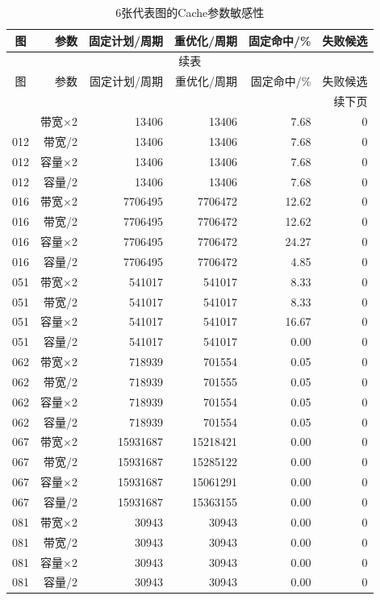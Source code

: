 \begin{longtable}{crrrrr}
\caption{6张代表图的Cache参数敏感性}\label{tab:sensitivity-detail}\\
\toprule
图 & 参数 & 固定计划/周期 & 重优化/周期 & 固定命中/\% & 失败候选 \\
\midrule
\endfirsthead
\multicolumn{6}{c}{续表}\\
\toprule
图 & 参数 & 固定计划/周期 & 重优化/周期 & 固定命中/\% & 失败候选 \\
\midrule
\endhead
\midrule\multicolumn{6}{r}{续下页}\\
\endfoot
\bottomrule
\endlastfoot
012 & 带宽×2 & 13406 & 13406 & 7.68 & 0 \\
012 & 带宽/2 & 13406 & 13406 & 7.68 & 0 \\
012 & 容量×2 & 13406 & 13406 & 7.68 & 0 \\
012 & 容量/2 & 13406 & 13406 & 7.68 & 0 \\
016 & 带宽×2 & 7706495 & 7706472 & 12.62 & 0 \\
016 & 带宽/2 & 7706495 & 7706472 & 12.62 & 0 \\
016 & 容量×2 & 7706495 & 7706472 & 24.27 & 0 \\
016 & 容量/2 & 7706495 & 7706472 & 4.85 & 0 \\
051 & 带宽×2 & 541017 & 541017 & 8.33 & 0 \\
051 & 带宽/2 & 541017 & 541017 & 8.33 & 0 \\
051 & 容量×2 & 541017 & 541017 & 16.67 & 0 \\
051 & 容量/2 & 541017 & 541017 & 0.00 & 0 \\
062 & 带宽×2 & 718939 & 701554 & 0.05 & 0 \\
062 & 带宽/2 & 718939 & 701555 & 0.05 & 0 \\
062 & 容量×2 & 718939 & 701554 & 0.05 & 0 \\
062 & 容量/2 & 718939 & 701554 & 0.05 & 0 \\
067 & 带宽×2 & 15931687 & 15218421 & 0.00 & 0 \\
067 & 带宽/2 & 15931687 & 15285122 & 0.00 & 0 \\
067 & 容量×2 & 15931687 & 15061291 & 0.00 & 0 \\
067 & 容量/2 & 15931687 & 15363155 & 0.00 & 0 \\
081 & 带宽×2 & 30943 & 30943 & 0.00 & 0 \\
081 & 带宽/2 & 30943 & 30943 & 0.00 & 0 \\
081 & 容量×2 & 30943 & 30943 & 0.00 & 0 \\
081 & 容量/2 & 30943 & 30943 & 0.00 & 0 \\
\end{longtable}
